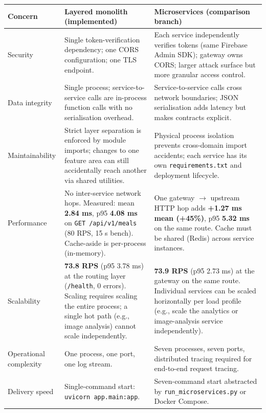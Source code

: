 \documentclass[11pt]{article}
\begin{document}
\begin{longtable}{p{2.8cm} p{6.3cm} p{6.1cm}}
  \toprule
  \textbf{Concern} & \textbf{Layered monolith (implemented)} & \textbf{Microservices (comparison branch)} \\
  \midrule
  \endhead

  Security
    & Single token-verification dependency; one CORS configuration; one TLS endpoint.
    & Each service independently verifies tokens (same Firebase Admin SDK); gateway owns CORS; larger attack surface but more granular access control. \\

  Data integrity
    & Single process; service-to-service calls are in-process function calls with no serialisation overhead.
    & Service-to-service calls cross network boundaries; JSON serialisation adds latency but makes contracts explicit. \\

  Maintainability
    & Strict layer separation is enforced by module imports; changes to one feature area can still accidentally reach another via shared utilities.
    & Physical process isolation prevents cross-domain import accidents; each service has its own \texttt{requirements.txt} and deployment lifecycle. \\

  Performance
    & No inter-service network hops. Measured: mean \textbf{2.84 ms}, p95 \textbf{4.08 ms}
      on \texttt{GET /api/v1/meals} (80 RPS, 15 s bench). Cache-aside is per-process (in-memory).
    & One gateway $\to$ upstream HTTP hop adds \textbf{+1.27 ms mean (+45\%)}, p95 \textbf{5.32 ms}
      on the same route. Cache must be shared (Redis) across service instances. \\

  Scalability
    & \textbf{73.8 RPS} (p95 3.78 ms) at the routing layer (\texttt{/health}, 0 errors).
      Scaling requires scaling the entire process; a single hot path (e.g., image analysis)
      cannot scale independently.
    & \textbf{73.9 RPS} (p95 2.73 ms) at the gateway on the same route.
      Individual services can be scaled horizontally per load profile
      (e.g., scale the analytics or image-analysis service independently). \\

  Operational complexity
    & One process, one port, one log stream.
    & Seven processes, seven ports, distributed tracing required for end-to-end request tracing. \\

  Delivery speed
    & Single-command start: \texttt{uvicorn app.main:app}.
    & Seven-command start abstracted by \texttt{run\_microservices.py} or Docker Compose. \\

  \bottomrule
\end{longtable}
\end{document}
